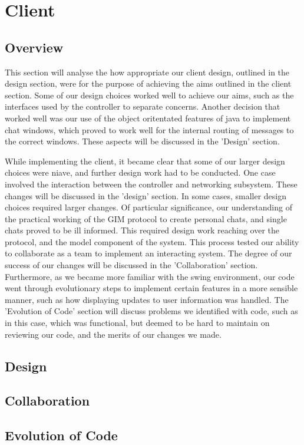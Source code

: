 \section{Client}

\subsection{Overview}

This section will analyse the how appropriate our client design, outlined in the design section, were for the purpose of achieving the aims outlined in the client section. Some of our design choices worked well to achieve our aims, such as the interfaces used by the controller to separate concerns. Another decision that worked well was our use of the object oritentated features of java to implement chat windows, which proved to work well for the internal routing of messages to the correct windows. These aspects will be discussed in the 'Design' section.

While implementing the client, it became clear that some of our larger design choices were niave, and further design work had to be conducted. One case involved the interaction between the controller and networking subsystem. These changes will be discussed in the 'design' section. In some cases, smaller design choices required larger changes. Of particular significance, our understanding of the practical working of the GIM protocol to create personal chats, and single chats proved to be ill informed. This required design work reaching over the protocol, and the model component of the system. This process tested our ability to collaborate as a team to implement an interacting system. The degree of our success of our changes will be discussed in the 'Collaboration' section. Furthermore, as we became more familiar with the swing environment, our code went through evolutionary steps to implement certain features in a more sensible manner, such as how displaying updates to user information was handled. The 'Evolution of Code' section will discuss problems we identified with code, such as in this case, which was functional, but deemed to be hard to maintain on reviewing our code, and the merits of our changes we made. 

\subsection{Design}

\subsection{Collaboration}

\subsection{Evolution of Code}
